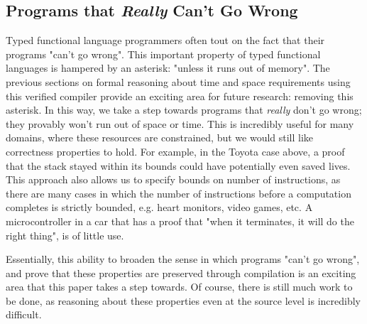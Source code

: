 \subsection{Programs that \emph{Really} Can't Go Wrong}

Typed functional language programmers often tout on the fact that their programs
"can't go wrong". This important property of typed functional languages is
hampered by an asterisk: "unless it runs out of memory".  The previous sections
on formal reasoning about time and space requirements using this verified
compiler provide an exciting area for future research: removing this asterisk.
In this way, we take a step towards programs that \emph{really} don't go wrong;
they provably won't run out of space or time. This is incredibly useful for many
domains, where these resources are constrained, but we would still like
correctness properties to hold. For example, in the Toyota case above, a proof
that the stack stayed within its bounds could have potentially even saved lives.
This approach also allows us to specify bounds on number of instructions, as
there are many cases in which the number of instructions before a computation
completes is strictly bounded, e.g. heart monitors, video games, etc. A
microcontroller in a car that has a proof that "when it terminates, it will do
the right thing", is of little use.  

Essentially, this ability to broaden the sense in which programs "can't go
wrong", and prove that these properties are preserved through compilation is an
exciting area that this paper takes a step towards. Of course, there is still
much work to be done, as reasoning about these properties even at the source
level is incredibly difficult.


